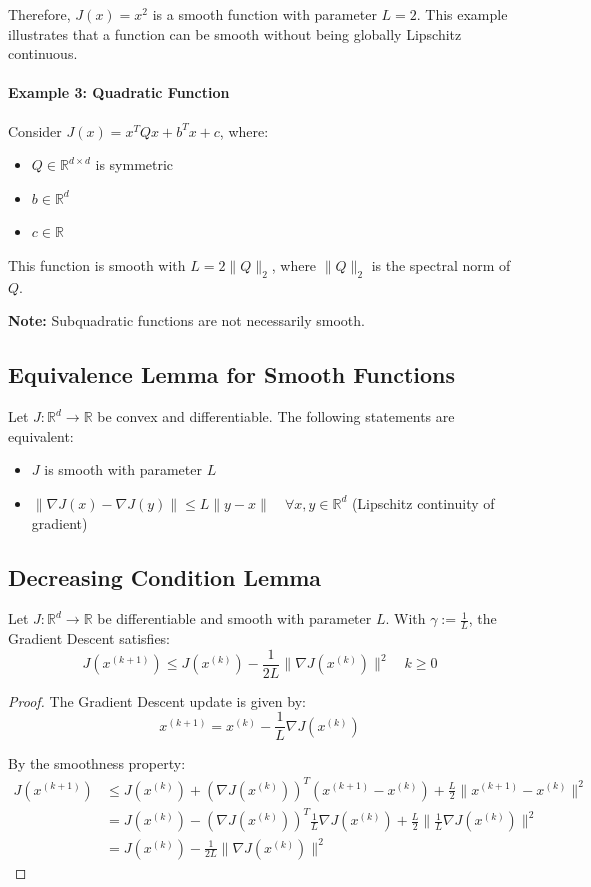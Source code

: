 Therefore, $J(x) = x^2$ is a smooth function with parameter $L = 2$. 
This example illustrates that a function can be smooth without being globally Lipschitz continuous.
\paragraph{Example 3: Quadratic Function}
Consider $J(x) = x^TQx + b^Tx + c$, where:
\begin{itemize}
    \item $Q \in \mathbb{R}^{d \times d}$ is symmetric
    \item $b \in \mathbb{R}^d$
    \item $c \in \mathbb{R}$
\end{itemize}
This function is smooth with $L = 2\|Q\|_2$, where $\|Q\|_2$ is the spectral norm of $Q$.

\textbf{Note:} Subquadratic functions are not necessarily smooth.\subsection*{Equivalence Lemma for Smooth Functions}
\begin{lemma}
Let $J: \mathbb{R}^d \to \mathbb{R}$ be convex and differentiable.
The following statements are equivalent:
\begin{itemize}
    \item $J$ is smooth with parameter $L$
    \item $\|\nabla J(x) - \nabla J(y)\| \leq L\|y-x\| \quad \forall x, y \in \mathbb{R}^d$ (Lipschitz continuity of gradient)
\end{itemize}
\end{lemma}

\subsection{Decreasing Condition Lemma}
\begin{lemma}
Let $J: \mathbb{R}^d \to \mathbb{R}$ be differentiable and smooth with parameter $L$. With $\gamma := \frac{1}{L}$, the Gradient Descent satisfies:
\[
J(x^{(k+1)}) \leq J(x^{(k)}) - \frac{1}{2L}\|\nabla J(x^{(k)})\|^2 \quad k \geq 0
\]
\end{lemma}

\begin{proof}
The Gradient Descent update is given by:
\[
x^{(k+1)} = x^{(k)} - \frac{1}{L}\nabla J(x^{(k)})
\]

By the smoothness property:
\begin{align*}
J(x^{(k+1)}) &\leq J(x^{(k)}) + (\nabla J(x^{(k)}))^T(x^{(k+1)} - x^{(k)}) + \frac{L}{2}\|x^{(k+1)} - x^{(k)}\|^2 \\
&= J(x^{(k)}) - (\nabla J(x^{(k)}))^T\frac{1}{L}\nabla J(x^{(k)}) + \frac{L}{2}\|\frac{1}{L}\nabla J(x^{(k)})\|^2 \\
&= J(x^{(k)}) - \frac{1}{2L}\|\nabla J(x^{(k)})\|^2
\end{align*}
\end{proof}

